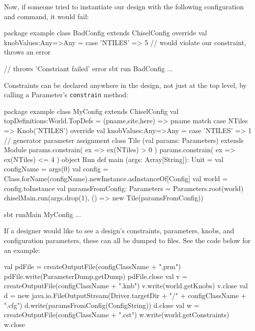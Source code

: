 \documentclass[10pt,twocolumn]{article}
\def\code#1{{\small\tt #1}}
\begin{document}
Now, if someone tried to instantiate our design with the following configuration and command, it would fail:

\begin{scala}
package example
class BadConfig extends ChiselConfig {
  override val knobValues:Any=>Any = {
    case 'NTILES' => 5 // would violate our constraint, throws an error
  }
}

// throws 'Constriant failed' error
sbt run BadConfig ... 
\end{scala}

Constraints can be declared anywhere in the design, not just at the top level, by calling a Parameter's \code{constrain} method:

\begin{scala}
package example
class MyConfig extends ChiselConfig {
  val topDefinitions:World.TopDefs = {
    (pname,site,here) => pname match {
      case NTiles => Knob('NTILES')
    }
  }
  override val knobValues:Any=>Any = {
    case 'NTILES' => 1 // generator parameter assignment
  }
}
class Tile (val params: Parameters) extends Module {
  params.constrain( ex => ex(NTiles) >  0 )
  params.constrain( ex => ex(NTiles) <= 4 )
}
object Run {
  def main (args: Array[String]): Unit = {
    val configName = args(0)
    val config = Class.forName(configName).newInstance.asInstanceOf[Config]
    val world = config.toInstance
    val paramsFromConfig: Parameters = Parameters.root(world)
    chiselMain.run(args.drop(1), () => new Tile(paramsFromConfig))
  }
}

sbt runMain MyConfig ...
\end{scala}


If a designer would like to see a design's constraints, parameters, knobs, and configuration parameters,
these can all be dumped to files. See the code below for an example:


\begin {scala}
  val pdFile = createOutputFile(configClassName + ".prm")
  pdFile.write(ParameterDump.getDump)
  pdFile.close
  val v = createOutputFile(configClassName + ".knb")
  v.write(world.getKnobs)
  v.close
  val d = new java.io.FileOutputStream(Driver.targetDir + "/" + configClassName + ".cfg")
  d.write(paramsFromConfig(ConfigString))
  d.close
  val w = createOutputFile(configClassName + ".cst")
  w.write(world.getConstraints)
  w.close
\end{scala}
\end{document}
